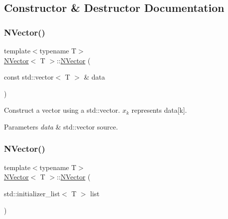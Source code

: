 \subsection{Constructor \& Destructor Documentation}
\mbox{\label{class_n_vector_a786957fb5d1d9bdec7e6ced65bce03c0}} 
\subsubsection{\texorpdfstring{NVector()}{NVector()}\hspace{0.1cm}{\footnotesize\ttfamily [1/5]}}
{\footnotesize\ttfamily template$<$typename T$>$ \\
\mbox{\hyperlink{class_n_vector}{N\+Vector}}$<$ T $>$\+::\mbox{\hyperlink{class_n_vector}{N\+Vector}} (\begin{DoxyParamCaption}\item[{const std\+::vector$<$ T $>$ \&}]{data }\end{DoxyParamCaption})\hspace{0.3cm}{\ttfamily [inline]}}



Construct a vector using a {\ttfamily std\+::vector}. $ x_k $ represents {\ttfamily data\mbox{[}k\mbox{]}}. 


\begin{DoxyParams}{Parameters}
{\em data} & {\ttfamily std\+::vector} source. \\
\hline
\end{DoxyParams}
\mbox{\label{class_n_vector_a44c7b132c668c2aac890b66fe7ab0262}} 
\subsubsection{\texorpdfstring{NVector()}{NVector()}\hspace{0.1cm}{\footnotesize\ttfamily [2/5]}}
{\footnotesize\ttfamily template$<$typename T$>$ \\
\mbox{\hyperlink{class_n_vector}{N\+Vector}}$<$ T $>$\+::\mbox{\hyperlink{class_n_vector}{N\+Vector}} (\begin{DoxyParamCaption}\item[{std\+::initializer\+\_\+list$<$ T $>$}]{list }\end{DoxyParamCaption})\hspace{0.3cm}{\ttfamily [inline]}}



